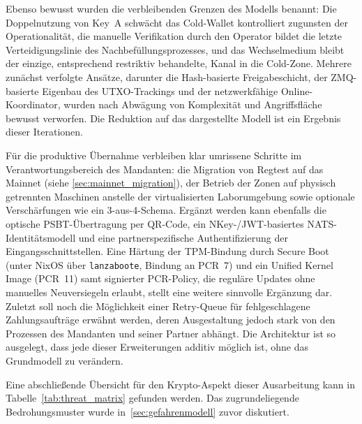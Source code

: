 Ebenso bewusst wurden die verbleibenden Grenzen des Modells benannt: 
Die Doppelnutzung von Key~A schwächt das Cold-Wallet kontrolliert zugunsten der Operationalität, die manuelle Verifikation durch den Operator bildet die letzte Verteidigungslinie des Nachbefüllungsprozesses, und das Wechselmedium bleibt der einzige, entsprechend restriktiv behandelte, Kanal in die Cold-Zone. Mehrere zunächst verfolgte Ansätze, darunter die Hash-basierte Freigabeschicht, der \ac{ZMQ}-basierte Eigenbau des \ac{UTXO}-Trackings und der netzwerkfähige Online-Koordinator, wurden nach Abwägung von Komplexität und Angriffsfläche bewusst verworfen. Die Reduktion auf das dargestellte Modell ist ein Ergebnis dieser Iterationen.

Für die produktive Übernahme verbleiben klar umrissene Schritte im Verantwortungsbereich des Mandanten: die Migration von Regtest auf das Mainnet (siehe \ref{sec:mainnet_migration}), der Betrieb der Zonen auf physisch getrennten Maschinen anstelle der virtualisierten Laborumgebung sowie optionale Verschärfungen wie ein 3-aus-4-Schema. Ergänzt werden kann ebenfalls die optische \ac{PSBT}-Übertragung per \ac{QR}-Code, ein NKey-/JWT-basiertes \ac{NATS}-Identitätsmodell und eine partnerspezifische Authentifizierung der Eingangsschnittstellen. 
Eine Härtung der \ac{TPM}-Bindung durch Secure Boot (unter NixOS über \texttt{lanzaboote}, Bindung an \ac{PCR}~7) und ein Unified Kernel Image (\ac{PCR}~11) samt signierter \ac{PCR}-Policy, die reguläre Updates ohne manuelles Neuversiegeln erlaubt, stellt eine weitere sinnvolle Ergänzung dar.
Zuletzt soll noch die Möglichkeit einer Retry-Queue für fehlgeschlagene Zahlungsaufträge erwähnt werden, deren Ausgestaltung jedoch stark von den Prozessen des Mandanten und seiner Partner abhängt. 
Die Architektur ist so ausgelegt, dass jede dieser Erweiterungen additiv möglich ist, ohne das Grundmodell zu verändern.

Eine abschließende Übersicht für den Krypto-Aspekt dieser Ausarbeitung kann in Tabelle~\ref{tab:threat_matrix} gefunden werden. Das zugrundeliegende Bedrohungsmuster wurde in~\ref{sec:gefahrenmodell} zuvor diskutiert.

